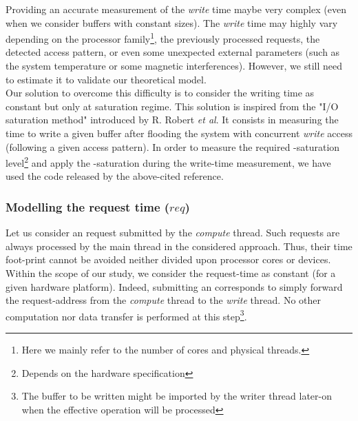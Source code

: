 			Providing an accurate measurement of the \emph{write} time maybe very complex (even when we consider buffers with constant sizes).   The \emph{write} time may highly vary depending on the processor family\footnote{Here we mainly refer to the number of cores and physical threads.}, the previously processed \notationIO\space requests, the detected \notationIO\space access pattern\cite{petrovic2015performance}, or even some unexpected external parameters (such as the system temperature or some magnetic interferences)\cite{lu2003performance}.
			However, we still need to estimate it to validate our theoretical model.\\

			Our solution to overcome this difficulty is to consider the writing time as constant but only at saturation regime.   This solution is inspired from the "I/O saturation method" introduced by R. Robert \emph{et al}\cite{ross2001case}.   It consists in measuring the time to write a given buffer after flooding the \notationIO\space system with concurrent \emph{write} access (following a given access pattern).   In order to measure the required \notationIO-saturation level\footnote{Depends on the hardware \notationIO\space specification} and apply the \notationIO-saturation during the write-time measurement, we have used the code released by the above-cited reference.\\

		\subsubsection{Modelling the \notationaio\space request time ($req$)}\label{subsubsection:modelRequestTime}
			Let us consider an \notationaio\space request submitted by the \emph{compute} thread.   Such requests are always processed by the main thread in the considered approach.   Thus, their time foot-print cannot be avoided neither divided upon processor cores or \notationIO\space devices.\\
			Within the scope of our study, we consider the \notationaio\space request-time as constant (for a given hardware platform).   Indeed, submitting an \notationaio\space corresponds to simply forward the request-address from the \emph{compute} thread to the \emph{write} thread.   No other computation nor data transfer is performed at this step\footnote{The buffer to be written might be imported by the writer thread later-on when the effective \notationIO\space operation will be processed}.\\

